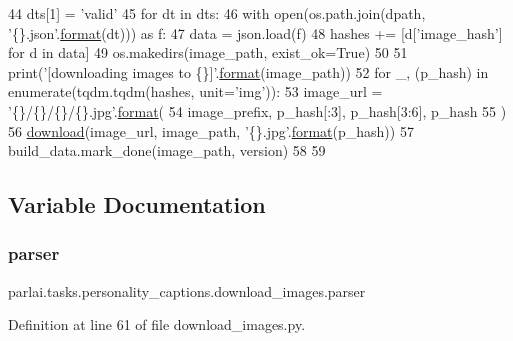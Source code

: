 \begin{DoxyCode}
44         dts[1] = \textcolor{stringliteral}{'valid'}
45     \textcolor{keywordflow}{for} dt \textcolor{keywordflow}{in} dts:
46         with open(os.path.join(dpath, \textcolor{stringliteral}{'\{\}.json'}.\hyperlink{namespaceparlai_1_1chat__service_1_1services_1_1messenger_1_1shared__utils_a32e2e2022b824fbaf80c747160b52a76}{format}(dt))) \textcolor{keyword}{as} f:
47             data = json.load(f)
48             hashes += [d[\textcolor{stringliteral}{'image\_hash'}] \textcolor{keywordflow}{for} d \textcolor{keywordflow}{in} data]
49     os.makedirs(image\_path, exist\_ok=\textcolor{keyword}{True})
50 
51     print(\textcolor{stringliteral}{'[downloading images to \{\}]'}.\hyperlink{namespaceparlai_1_1chat__service_1_1services_1_1messenger_1_1shared__utils_a32e2e2022b824fbaf80c747160b52a76}{format}(image\_path))
52     \textcolor{keywordflow}{for} \_, (p\_hash) \textcolor{keywordflow}{in} enumerate(tqdm.tqdm(hashes, unit=\textcolor{stringliteral}{'img'})):
53         image\_url = \textcolor{stringliteral}{'\{\}/\{\}/\{\}/\{\}.jpg'}.\hyperlink{namespaceparlai_1_1chat__service_1_1services_1_1messenger_1_1shared__utils_a32e2e2022b824fbaf80c747160b52a76}{format}(
54             image\_prefix, p\_hash[:3], p\_hash[3:6], p\_hash
55         )
56         \hyperlink{namespaceparlai_1_1core_1_1build__data_ab74f0e428f05e5d91fa93c8afb367622}{download}(image\_url, image\_path, \textcolor{stringliteral}{'\{\}.jpg'}.\hyperlink{namespaceparlai_1_1chat__service_1_1services_1_1messenger_1_1shared__utils_a32e2e2022b824fbaf80c747160b52a76}{format}(p\_hash))
57     build\_data.mark\_done(image\_path, version)
58 
59 
\end{DoxyCode}


\subsection{Variable Documentation}
\mbox{\label{namespaceparlai_1_1tasks_1_1personality__captions_1_1download__images_ad569e6f3e90709b66c27bc16b83e9275}} 
\subsubsection{\texorpdfstring{parser}{parser}}
{\footnotesize\ttfamily parlai.\+tasks.\+personality\+\_\+captions.\+download\+\_\+images.\+parser}



Definition at line 61 of file download\+\_\+images.\+py.

